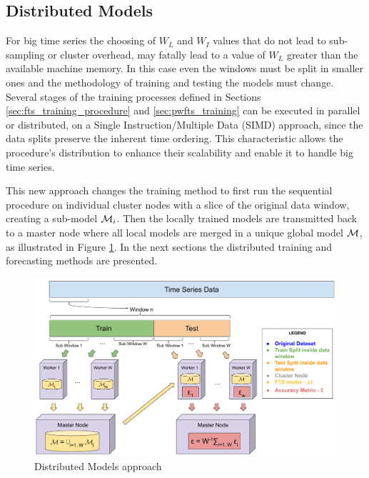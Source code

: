 \subsection{Distributed Models}
\label{sec:distributed_models}

For big time series the choosing of $W_L$ and $W_I$ values that do not lead to sub-sampling or cluster overhead, may fatally lead to a value of $W_L$ greater than the available machine memory. In this case even the windows must be split in smaller ones and the methodology of training and testing the models must change. Several stages of the training processes defined in Sections \ref{sec:fts_training_procedure} and  \ref{sec:pwfts_training} can be executed in parallel or distributed, on a Single Instruction/Multiple Data (SIMD) approach, since the data splits preserve the inherent time ordering. This characteristic allows the procedure's distribution to enhance their scalability and enable it to handle big time series.

This new approach changes the training method to first run the sequential procedure on individual cluster nodes with a slice of the original data window, creating a sub-model $\mathcal{M}_i$. Then the locally trained models are transmitted back to a master node where all local models are merged in a unique global model $\mathcal{M}$, as illustrated in Figure \ref{fig:distributed_models}. In the next sections the distributed training and forecasting methods are presented.

\begin{figure}[htb]
    \centering
    \includegraphics[width=\textwidth]{figures/distributed_models.pdf}
    \caption{Distributed Models approach}
    \label{fig:distributed_models}
\end{figure}


